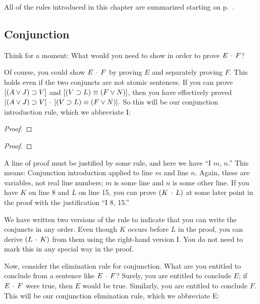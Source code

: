 All of the rules introduced in this chapter are summarized starting on p.~\pageref{sec:proof_rules}.


\subsection{Conjunction}

Think for a moment: What would you need to show in order to prove $E \,\cdot\, F$?

Of course, you could show $E \,\cdot\, F$ by proving $E$ and separately proving $F$. This holds even if the two conjuncts are not atomic sentences. If you can prove $[(A \vee J) \supset V]$ and  $[(V \supset L) \equiv (F \vee N)]$, then you have effectively proved $[(A \vee J) \supset V] \,\cdot\, [(V \supset L) \equiv (F \vee N)].$
So this will be our conjunction introduction rule, which we abbreviate {\eand}I:

\begin{multicols}{2}

\begin{proof}
	 
\end{proof}

\begin{proof}
	 
\end{proof}

\end{multicols}

A line of proof must be justified by some rule, and here we have ``{\eand}I $m$, $n$.'' This means: Conjunction introduction applied to line $m$ and line $n$. Again, these are variables, not real line numbers; $m$ is some line and $n$ is some other line. If you have $K$ on line 8 and $L$ on line 15, you can prove $(K\,\cdot\, L)$ at some later point in the proof with the justification ``{\eand}I 8, 15.'' 

We have written two versions of the rule to indicate that you can write the conjuncts in any order. Even though $K$ occurs before $L$ in the proof, you can derive $(L \,\cdot\, K)$ from them using the right-hand version {\eand}I. You do not need to mark this in any special way in the proof.

Now, consider the elimination rule for conjunction. What are you entitled to conclude from a sentence like $E \,\cdot\, F$? Surely, you are entitled to conclude $E$; if $E \,\cdot\, F$ were true, then $E$ would be true. Similarly, you are entitled to conclude $F$. This will be our conjunction elimination rule, which we 
abbreviate {\eand}E:

